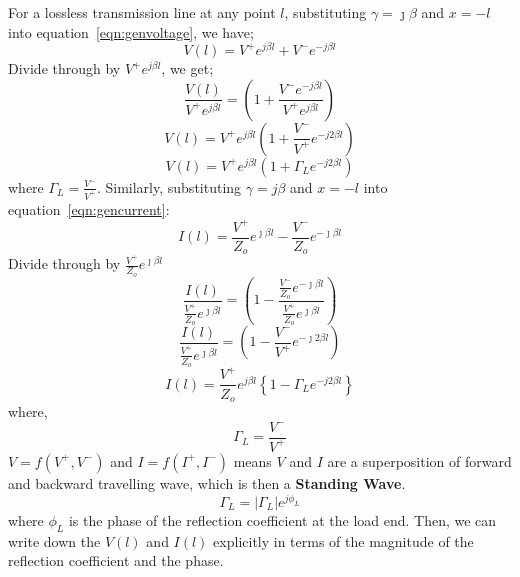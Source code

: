 For a lossless transmission line at any point $l$, substituting $\gamma = \jmath\beta$ and $x=-l$ into equation~\ref{eqn:genvoltage}, we have;
\begin{equation*}
V(l) = V^+ e^{j \beta l} + V^- e^{- j \beta l}
\end{equation*}
Divide through by $ V^+ e^{j \beta l}$, we get;
\begin{equation*}
\frac{V(l)}{ V^+ e^{j \beta l}}= \left(1 +\frac{V^- e^{- j \beta l}}{V^+ e^{j \beta l}}\right)
\end{equation*}
\begin{equation*}
V(l) = V^+ e^{j \beta l}\left(1+ \frac{V^-}{V^+}e^{-j 2 \beta l}\right)
\end{equation*}
\begin{equation}
V(l) = V^+ e^{j \beta l}(1 + \Gamma_L e^{-j 2 \beta l})
\label{eqn:voltagefromload2}
\end{equation}
where $\Gamma _L = \frac{V^-}{V^+}$. Similarly, substituting $\gamma = j\beta$ and $x = -l$ into equation~\ref{eqn:gencurrent}:
\begin{equation*}
I(l) = \frac{V^+}{Z_o}  e^{\jmath \beta l} - \frac{V^-}{Z_o} e^{-\jmath\beta l}
\end{equation*}
Divide through by $\frac{V^+}{Z_o}  e^{\jmath\beta l}$
\begin{equation*}
\frac{I(l)}{\frac{V^+}{Z_o}  e^{\jmath\beta l}} = \left( 1- \frac{\frac{V^-}{Z_o} e^{-\jmath\beta l}}{\frac{V^+}{Z_o}  e^{\jmath\beta l}}\right)
\end{equation*}
\begin{equation*}
\frac{I(l)}{\frac{V^+}{Z_o}  e^{\jmath\beta l}} = \left(1-  \frac{V^-}{V^+}e^{-\jmath 2 \beta l}\right)
\end{equation*}
\begin{equation}
I(l) = \frac{V^+}{Z_o}e ^{j \beta l}  \left\{ 1 - \Gamma_L e^{-j 2 \beta l}\right\}
\label{eqn:currentfromload2}
\end{equation}
where,
\begin{equation*}
\Gamma _L = \frac{V^-}{V^+}
\end{equation*}
$V = f( V^{+}, V^{-})$ and $I = f(I^{+}, I^{-})$ means $V$ and $I$ are a superposition of forward and backward travelling wave, which is then a \textbf{Standing Wave}. 
\begin{equation}
\Gamma_L = |\Gamma_L|e^{j\phi_L}
\label{eqn:refcoefficientfromload}
\end{equation}
where $\phi_L$ is the phase of the reflection coefficient at the load end. Then, we can write down the $V(l)$ and $I(l)$ explicitly in terms of the magnitude of the reflection coefficient and the phase.

